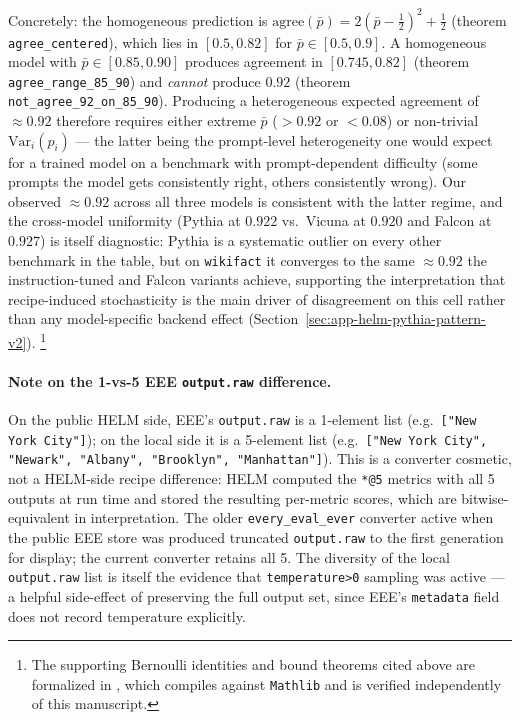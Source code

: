 Concretely: the homogeneous prediction is
  $\text{agree}(\bar p) = 2(\bar p - \tfrac{1}{2})^2 + \tfrac{1}{2}$
  (theorem \texttt{agree\_centered}), which lies in
  $[0.5, 0.82]$ for $\bar p \in [0.5, 0.9]$.
A homogeneous model with $\bar p \in [0.85, 0.90]$ produces
  agreement in $[0.745, 0.82]$ (theorem \texttt{agree\_range\_85\_90})
  and \emph{cannot} produce $0.92$ (theorem
  \texttt{not\_agree\_92\_on\_85\_90}).
Producing a heterogeneous expected agreement of $\approx 0.92$
  therefore requires either extreme $\bar p$ ($> 0.92$ or
  $< 0.08$) or non-trivial $\mathrm{Var}_i(p_i)$ — the latter being
  the prompt-level heterogeneity one would expect for a trained model
  on a benchmark with prompt-dependent difficulty (some prompts the
  model gets consistently right, others consistently wrong).
Our observed $\approx 0.92$ across all three models is consistent with
  the latter regime, and the cross-model uniformity (Pythia at $0.922$
  vs.\ Vicuna at $0.920$ and Falcon at $0.927$) is itself diagnostic:
  Pythia is a systematic outlier on every other benchmark in the
  table, but on \texttt{wikifact} it converges to the same $\approx 0.92$
  the instruction-tuned and Falcon variants achieve, supporting the
  interpretation that recipe-induced stochasticity is the main driver
  of disagreement on this cell rather than any model-specific backend
  effect (Section~\ref{sec:app-helm-pythia-pattern-v2}).
\footnote{The supporting Bernoulli identities and bound theorems
  cited above are formalized in
  , which
  compiles against \texttt{Mathlib} and is verified independently of
  this manuscript.}

\paragraph{Note on the 1-vs-5 EEE \texttt{output.raw} difference.}
On the public HELM side, EEE's \texttt{output.raw} is a 1-element list
  (e.g.\ \texttt{["New York City"]}); on the local side it is a
  5-element list (e.g.\ \texttt{["New York City", "Newark", "Albany",
  "Brooklyn", "Manhattan"]}).
This is a converter cosmetic, not a HELM-side recipe difference: HELM
  computed the \texttt{*@5} metrics with all 5 outputs at run time and
  stored the resulting per-metric scores, which are bitwise-equivalent
  in interpretation.
The older \texttt{every\_eval\_ever} converter active when the public
  EEE store was produced truncated \texttt{output.raw} to the first
  generation for display; the current converter retains all 5.
The diversity of the local \texttt{output.raw} list is itself the
  evidence that \texttt{temperature>0} sampling was active --- a
  helpful side-effect of preserving the full output set, since EEE's
  \texttt{metadata} field does not record temperature explicitly.


